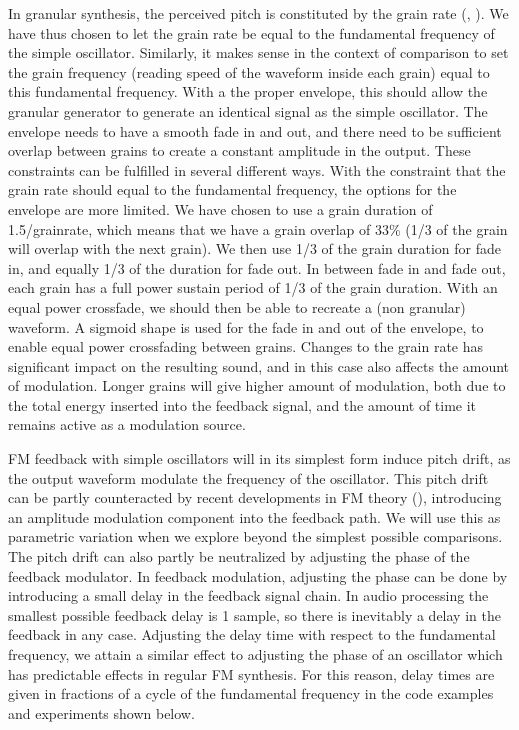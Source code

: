 \documentclass[runningheads,a4paper]{llncs}
\begin{document}
In granular synthesis, the perceived pitch is constituted by the grain rate (\cite{Roads-2001}, \cite{Brandtsegg-particle}). We have thus chosen to let the grain rate be equal to the fundamental frequency of the simple oscillator. Similarly, it makes sense in the context of comparison to set the grain frequency (reading speed of the waveform inside each grain) equal to this fundamental frequency. With a the proper envelope, this should allow the granular generator to generate an identical signal as the simple oscillator. The envelope needs to have a smooth fade in and out, and there need to be sufficient overlap between grains to create a constant amplitude in the output. These constraints can be fulfilled in several different ways. With the constraint that the grain rate should equal to the fundamental frequency, the options for the envelope are more limited. We have chosen to use a grain duration of 1.5/grainrate, which means that we have a grain overlap of 33\% (1/3 of the grain will overlap with the next grain). We then use 1/3 of the grain duration for fade in, and equally 1/3 of the duration for fade out. In between fade in and fade out, each grain has a full power sustain period of 1/3 of the grain duration. With an equal power crossfade, we should then be able to recreate a (non granular) waveform. A sigmoid shape is used for the fade in and out of the envelope, to enable equal power crossfading between grains. Changes to the grain rate has significant impact on the resulting sound, and in this case also affects the amount of modulation. Longer grains will give higher amount of modulation, both due to the total energy inserted into the feedback signal, and the amount of time it remains active as a modulation source.

FM feedback with simple oscillators will in its simplest form induce pitch drift, as the output waveform modulate the frequency of the oscillator. This pitch drift can be partly counteracted by recent developments in FM theory (\cite{Lazzarini-2024}), introducing an amplitude modulation component into the feedback path. We will use this as parametric variation when we explore beyond the simplest possible comparisons. The pitch drift can also partly be neutralized by adjusting the phase of the feedback modulator. In feedback modulation, adjusting the phase can be done by introducing a small delay in the feedback signal chain. In audio processing the smallest possible feedback delay is 1 sample, so there is inevitably a delay in the feedback in any case. Adjusting the delay time with respect to the fundamental frequency, we attain a similar effect to adjusting the phase of an oscillator which has predictable effects in regular FM synthesis. For this reason, delay times are given in fractions of a cycle of the fundamental frequency in the code examples and experiments shown below.
\end{document}
